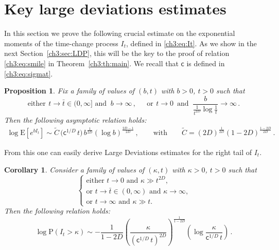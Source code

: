 \documentclass[a4paper,reqno,11pt]{amsart}
\numberwithin{equation}{section}
\newtheorem{proposition}[theorem]{Proposition}
\newtheorem{corollary}[theorem]{Corollary}
\renewcommand{\tilde}{\widetilde}          %
\newcommand{\PEfont}{\mathrm}
\renewcommand{\P}{\ensuremath{\PEfont P}}
\newcommand{\E}{\ensuremath{\PEfont E}}
\newcommand\sfc{\mathsf{c}}
\begin{document}
\section{Key large deviations estimates}

\label{ch3:sec:ld}

In this section we prove the following crucial estimate on the
exponential moments of the time-change process $I_t$,
defined in \eqref{ch3:eq:It}. As we show in the next Section~\ref{ch3:sec:LDP},
this will be the key to the proof of relation \eqref{ch3:eq:smile}
in Theorem~\ref{ch3:th:main}.
We recall that $\sfc$ is defined in \eqref{ch3:eq:sigmat}.

\begin{proposition} \label{ch3:th:crucial}
Fix a family of values of $(b,t)$ with $b > 0$, $t > 0$ such that
\begin{equation} \label{ch3:eq:assat}
	\text{either} \, \ t \to \bar t \in (0,\infty] \text{ and } \ b \to \infty \,,
	\quad \ \ \text{or} \ \, t \to 0 \, \text{ and } \
	\frac{b}{\frac{1}{t^{2D}} \log \frac{1}{t}}  \to \infty \,.
\end{equation}
Then the following asymptotic relation holds:
\begin{align} \label{ch3:eq:keygoal0}
	\log \E[e^{b I_t}] \sim 
	\tilde C\, \big(\sfc^{1/D} \, t \big) \, b^{\frac{1}{2D}}(\log b)^{\frac{2D-1}{2D}}\,, 
	\qquad \text{with} \qquad \tilde C
	= (2D)^{\frac{1}{2D}}(1-2D)^{\frac{1-2D}{2D}} \,.
\end{align}
\end{proposition}


From this one can easily derive Large Deviations estimates
 for the right tail of $I_t$.
 
\begin{corollary}\label{ch3:coro:LDP I}
Consider a family of values of $(\kappa, t)$ with $\kappa > 0$, $t > 0$ such that
\begin{equation} \label{ch3:eq:added}
\begin{cases}
\text{either $t \to 0$ and $\kappa \gg t^{2D}$, }\\
\text{or $t \to \bar t \in (0,\infty)$ and $\kappa \to \infty$,}\\
\text{or $t \to \infty$ and $\kappa \gg t$.}
\end{cases}
\end{equation}
Then the following relation holds:
\begin{equation} \label{ch3:eq:boundIt}
	\log\P(I_t>\kappa) \sim - \frac{1}{1-2D}
	\left(\frac{\kappa}{(\sfc^{1/D}  \,t)^{2D}}
	\right)^{\frac{1}{1-2D}}\left(\log \frac{\kappa }{\sfc^{1/D} \, t}\right)
	\,. 
\end{equation}
\end{corollary}
\end{document}
